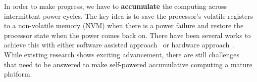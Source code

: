 
In order to make progress, we have to \textbf{accumulate} the computing across intermittent power cycles. The key idea is to save the processor's volatile registers to a non-volatile memory (NVM) when there is a power failure and restore the processor state when the power comes back on. There have been several works to achieve this with either software assisted approach~\cite{6960060,Jayakumar:2015:QUR:2810396.2700249,Ransford:2011:MSS:1950365.1950386} or hardware approach~\cite{7056060}. While existing research shows exciting advancement, there are still challenges that need to be answered to make self-powered accumulative computing a mature platform. 

%



